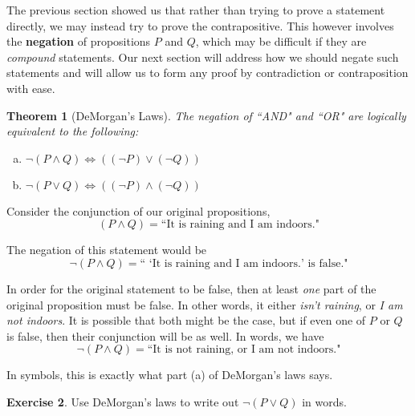 \documentclass[12pt]{article}
\renewcommand{\_}[1]{\underline{ #1 }}
\newtheorem{theorem}{\color{navy}Theorem}
\theoremstyle{definition}
\newtheorem{exercise}[theorem]{\color{orange}Exercise}
\numberwithin{equation}{subsection}
\begin{document}
\bigskip


The previous section showed us that rather than trying to prove a statement directly, we may instead try to prove the contrapositive. This however involves the \textbf{negation} of propositions $P$ and $Q$, which may be difficult if they are \emph{compound} statements. Our next section will address how we should negate such statements and will allow us to form any proof by contradiction or contraposition with ease.

\newpage


\begin{theorem}[DeMorgan's Laws]
    The negation of ``AND" and ``OR" are logically equivalent to the following:
    \begin{enumerate}[(a)]
        \item $\neg (P \land Q) \Longleftrightarrow ((\neg P) \lor (\neg Q))$
        \item $\neg (P \lor Q) \Longleftrightarrow ((\neg P) \land (\neg Q))$
    \end{enumerate}
\end{theorem}

Consider the conjunction of our original propositions,
	\[
	    (P \land Q) = \text{``It is raining and I am indoors."}
	\]

The negation of this statement would be
    \[
	    \neg (P \land Q) = \text{`` `It is raining and I am indoors.' is false."}
    \]
    

In order for the original statement to be false, then at least \emph{one} part of the original proposition must be false. In other words, it either \emph{isn't raining}, or \emph{I am not indoors}. It is possible that both might be the case, but if even one of $P$ or $Q$ is false, then their conjunction will be as well. In words, we have
    \[
	    \neg (P \land Q) = \text{``It is not raining, or I am not indoors."}
    \]

In symbols, this is exactly what part (a) of DeMorgan's laws says.


\begin{exercise}
    Use DeMorgan's laws to write out $\neg (P \lor Q)$ in words.
\end{exercise}
\end{document}
